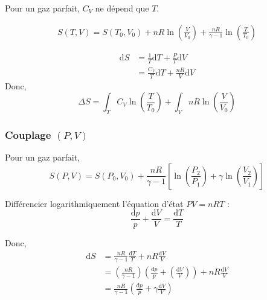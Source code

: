 
Pour un gaz parfait, $C_V$ ne dépend que $T$. 

\begin{gather}
  S(T, V) = S(T_0, V_0) + nR \ln \left( \frac{V}{V_0}  \right) + \frac{nR}{\gamma - 1}  \ln \left( \frac{T}{T_0}  \right)
\end{gather}

\begin{myproof}{}{}
  \begin{align}
    \mathrm{d}S &= \frac{1}{T} \mathrm{d} T + \frac{P}{T} \mathrm{d} V \\  
                &= \frac{C_V}{T} \mathrm{d}T + \frac{nR}{V}  \mathrm{d} V
  \end{align}
  Donc, 
  \begin{equation}
    \Delta S = \int_{T}^{} C_V \ln \left( \frac{T}{T_0}  \right)+ \int_{V}^{} nR \ln\left( \frac{V}{V_0}  \right)
  \end{equation}
\end{myproof}

\subsubsection{Couplage $(P,V)$} %
\label{sec:Couplage $(P,V)$}

Pour un gaz parfait, 
\begin{equation}
  S(P,V) = S(P_0, V_0) + \frac{nR}{\gamma-1}  \left[ \ln \left( \frac{P_2}{P_1}  \right) + \gamma \ln \left( \frac{V_2}{V_1}  \right) \right]
\end{equation}

\begin{myproof}{}{}
\begin{note}{}{}
Différencier logarithmiquement l'équation d'état $PV = nRT$ : 
\begin{equation}
  \frac{\mathrm{d}p}{p}  +  \frac{\mathrm{d}V}{V} = \frac{\mathrm{d}T}{T} 
\end{equation}
\end{note}

Donc, 
\begin{align}
  \mathrm{d} S &= \frac{nR}{\gamma-1} \frac{\mathrm{d}T}{T}  + nR \frac{\mathrm{d}V}{V}  \\ 
               &= \left( \frac{nR}{\gamma-1}  \right) \left( \frac{\mathrm{d}p}{p}  + \left( \frac{\mathrm{d}V}{V}  \right) \right) + nR \frac{\mathrm{d}V}{V}  \\ 
               &= \frac{nR}{\gamma-1}  \left( \frac{\mathrm{d}p}{p}  + \gamma \frac{\mathrm{d}V}{V}  \right)
\end{align}


\end{myproof}


